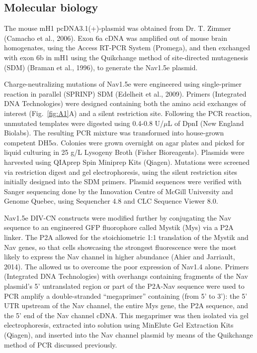 \subsection{Molecular biology}
The mouse mH1 pcDNA3.1(+)-plasmid was obtained from Dr. T. Zimmer (Camacho et al., 2006). Exon 6a cDNA was amplified out of mouse brain homogenates, using the Access RT-PCR System (Promega), and then exchanged with exon 6b in mH1 using the Quikchange method of site-directed mutagenesis (SDM) (Braman et al., 1996), to generate the Nav1.5e plasmid.

Charge-neutralizing mutations of Nav1.5e were engineered using single-primer reaction in parallel (SPRINP) SDM (Edelheit et al., 2009). Primers (Integrated DNA Technologies) were designed containing both the amino acid exchanges of interest (Fig.~\ref{fig:A1}A) and a silent restriction site. Following the PCR reaction, unmutated templates were digested using 0.4-0.8 U/$\mu$L of DpnI (New England Biolabs). The resulting PCR mixture was transformed into house-grown competent DH5$\alpha$. Colonies were grown overnight on agar plates and picked for liquid culturing in 25 g/L Lysogeny Broth (Fisher Bioreagents). Plasmids were harvested using QIAprep Spin Miniprep Kits (Qiagen). Mutations were screened via restriction digest and gel electrophoresis, using the silent restriction sites initially designed into the SDM primers. Plasmid sequences were verified with Sanger sequencing done by the Innovation Centre of McGill University and Genome Quebec, using Sequencher 4.8 and CLC Sequence Viewer 8.0.

Nav1.5e DIV-CN constructs were modified further by conjugating the Nav sequence to an engineered GFP fluorophore called Mystik (Mys) via a P2A linker. The P2A allowed for the stoichiometric 1:1 translation of the Mystik and Nav genes, so that cells showcasing the strongest fluorescence were the most likely to express the Nav channel in higher abundance (Ahier and Jarriault, 2014). The allowed us to overcome the poor expression of Nav1.4 alone. Primers (Integrated DNA Technologies) with overhangs containing fragments of the Nav plasmid’s 5’ untranslated region or part of the P2A-Nav sequence were used to PCR amplify a double-stranded “megaprimer” containing (from 5’ to 3’): the 5’ UTR upstream of the Nav channel, the entire Mys gene, the P2A sequence, and the 5’ end of the Nav channel cDNA. This megaprimer was then isolated via gel electrophoresis, extracted into solution using MinElute Gel Extraction Kits (Qiagen), and inserted into the Nav channel plasmid by means of the Quikchange method of PCR discussed previously.

